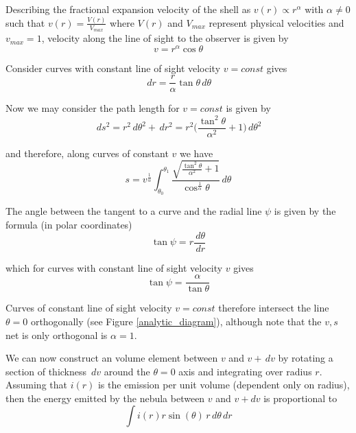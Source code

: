 Describing the fractional expansion velocity of the shell as $v(r) \propto 
r^\alpha$ with $\alpha \neq 0$ such that $v(r)=\frac{V(r)}{V_{max}}$ where 
$V(r)$ and $V_{max}$ represent physical velocities and $v_{max}=1$, velocity along the line of sight to the observer is given by 
\begin{equation}
\label{eqn:radial_vel}
v=r^\alpha \cos \theta
\end{equation}

Consider curves with constant line of sight velocity $v=const$ gives
\begin{equation}
\,d r = \frac{r}{\alpha} \tan \theta \,d \theta
\end{equation}

Now we may consider the path length for $v = const$ is given by
\begin{equation}
\, ds^2 = r^2 \, d\theta^2 + \, dr^2 = r^2 \Big( \frac{\tan^2\theta}{\alpha^2}+1 \Big)\, d\theta^2
\end{equation}

\noindent and therefore, along curves of constant $v$ we have
 \begin{equation}
 \label{eqn:vs}
s = v^{\frac{1}{\alpha}} \int_{\theta_{0}}^{\theta_{1}} \frac{\sqrt{\frac{\tan^2\theta}{\alpha^2}+1}}{\cos ^ {\frac{1}{\alpha}}\theta}\, d\theta
\end{equation}


The angle between the tangent to a curve and the radial line $\psi$ is given by the formula (in polar coordinates) \begin{equation}
\tan \psi = r \frac{\, d \theta}{\, d r} 
\end{equation}

\noindent which for curves with constant line of sight velocity $v$ gives
\begin{equation}
\tan \psi = \frac{\alpha}{\tan \theta}
\end{equation}

Curves of constant line of sight velocity $v=const$ therefore intersect the line $\theta = 0$ orthogonally (see Figure \ref{analytic_diagram}), although note that the $v,s$ net is only orthogonal is $\alpha=1$.

We can now construct an volume element between $v$ and $v+\, dv$ by rotating a section of thickness $\, dv$  around the $\theta =0 $ axis and integrating over radius $r$.  Assuming that $i(r)$ is the emission per unit volume (dependent only on radius), then the energy emitted by the nebula between $v$ and $v+dv$ is proportional to
\begin{equation}
\int i(r) r \sin (\theta) \, r \, d\theta \, dr
\end{equation}


